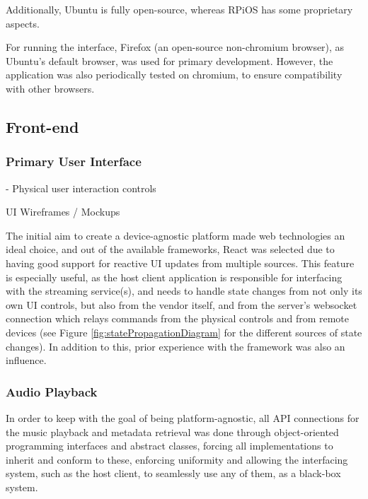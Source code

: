                Additionally, Ubuntu is fully open-source, whereas RPiOS has some proprietary aspects.
    
                For running the interface, Firefox (an open-source non-chromium browser), as Ubuntu's default browser, was used for primary development. However, the application was also periodically tested on chromium, to ensure compatibility with other browsers.
        
        \subsection{Front-end}
            \subsubsection{Primary User Interface}
    
                \begin{temp}
                    - Physical user interaction controls
                \end{temp}
    
                \begin{temp}
                    UI Wireframes / Mockups
                \end{temp}
    
                The initial aim to create a device-agnostic platform made web technologies an ideal choice, and out of the available frameworks, React was selected due to having good support for reactive UI updates from multiple sources. This feature is especially useful, as the host client application is responsible for interfacing with the streaming service(s), and needs to handle state changes from not only its own UI controls, but also from the vendor itself, and from the server's websocket connection which relays commands from the physical controls and from remote devices (see Figure \ref{fig:statePropagationDiagram} for the different sources of state changes). In addition to this, prior experience with the framework was also an influence.
            
            \subsubsection{Audio Playback}
    
                In order to keep with the goal of being platform-agnostic, all API connections for the music playback and metadata retrieval was done through object-oriented programming interfaces and abstract classes, forcing all implementations to inherit and conform to these, enforcing uniformity and allowing the interfacing system, such as the host client, to seamlessly use any of them, as a black-box system.
    
